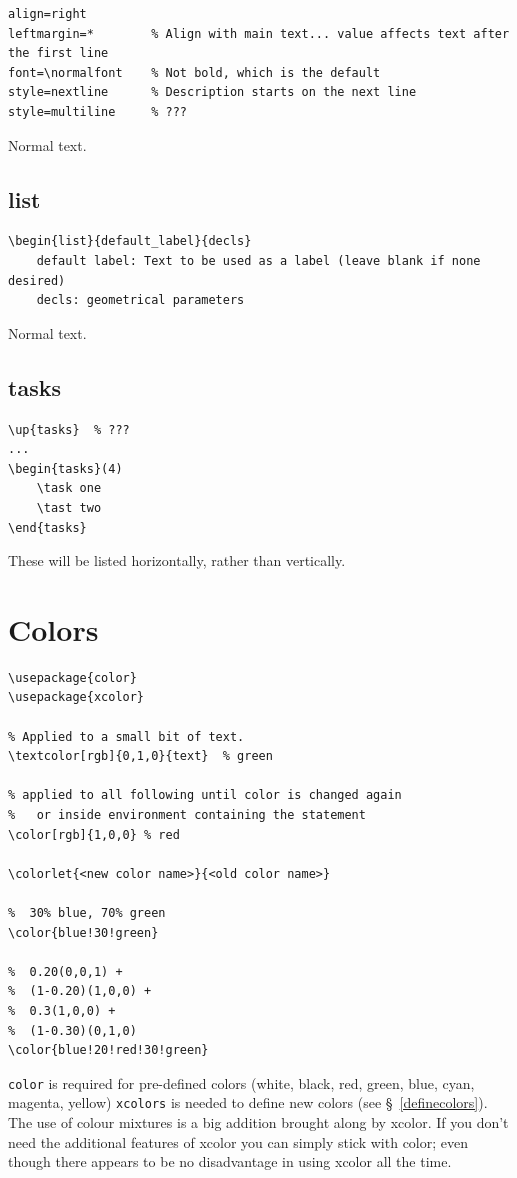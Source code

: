 \documentclass{article}
\begin{document}
\begin{lstlisting}
align=right
leftmargin=*        % Align with main text... value affects text after the first line
font=\normalfont    % Not bold, which is the default
style=nextline      % Description starts on the next line
style=multiline     % ???
\end{lstlisting}
Normal text.

\subsection{list}
\begin{lstlisting}
\begin{list}{default_label}{decls}
    default label: Text to be used as a label (leave blank if none desired)
    decls: geometrical parameters
\end{lstlisting}
Normal text.

\subsection{tasks}
\begin{lstlisting}
\up{tasks}  % ???
...
\begin{tasks}(4)
    \task one
    \tast two
\end{tasks}
\end{lstlisting}
These will be listed horizontally, rather than vertically.


\section{Colors}\label{color}

\begin{lstlisting}
\usepackage{color}
\usepackage{xcolor}

% Applied to a small bit of text.
\textcolor[rgb]{0,1,0}{text}  % green

% applied to all following until color is changed again
%   or inside environment containing the statement
\color[rgb]{1,0,0} % red

\colorlet{<new color name>}{<old color name>}

%  30% blue, 70% green
\color{blue!30!green}

%  0.20(0,0,1) +
%  (1-0.20)(1,0,0) +
%  0.3(1,0,0) +
%  (1-0.30)(0,1,0)
\color{blue!20!red!30!green}

\end{lstlisting}

\texttt{color} is required for pre-defined colors (white, black, red, green,
blue, cyan, magenta, yellow) \texttt{xcolors} is needed to define new
colors (see \S{}~\ref{definecolors}).  The use of colour mixtures is a big
addition brought along by xcolor. If
you don't need the additional features of xcolor you can simply stick with
color; even though there appears to be no disadvantage in using xcolor all
the time.
\end{document}
